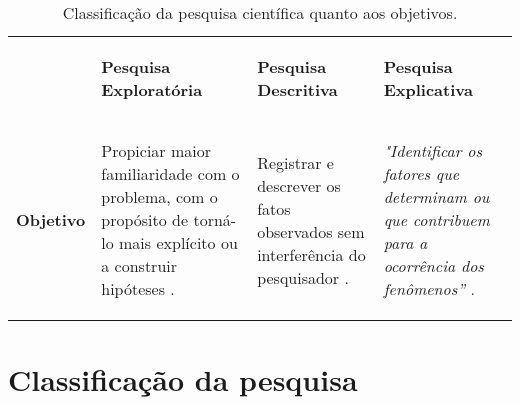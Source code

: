 \begin{table}[h]
 \centering
 \caption{Classificação da pesquisa científica quanto aos objetivos.}
 \label{tab:classificacao_pesquisa}
 {\renewcommand\arraystretch{1.25}
 \begin{tabular}{ l l l l }
  \cline{1-1}\cline{2-2}\cline{3-3}\cline{4-4}  
    \multicolumn{1}{|p{1.883cm}|}{\begin{center} 
\end{center}} &
    \multicolumn{1}{p{3.517cm}|}{\begin{center}\textbf{Pesquisa Exploratória}
\end{center}} &
    \multicolumn{1}{p{3.600cm}|}{\begin{center}\textbf{Pesquisa Descritiva}
\end{center}} &
    \multicolumn{1}{p{3.583cm}|}{\begin{center}\textbf{Pesquisa Explicativa}
\end{center}}
  \\  
  \cline{1-1}\cline{2-2}\cline{3-3}\cline{4-4}  
    \multicolumn{1}{|p{1.883cm}|}{\begin{center}\textbf{Objetivo}
\end{center}} &
    \multicolumn{1}{p{3.517cm}|}{\begin{center}Propiciar maior familiaridade com o problema, com o propósito de torná-lo mais explícito ou a construir hipóteses \cite[pág. 41]{gil2002}.
\end{center}} &
    \multicolumn{1}{p{3.600cm}|}{\begin{center}Registrar e descrever os fatos observados sem interferência do pesquisador \cite[pág. 52]{prodanov2013}.
\end{center}} &
    \multicolumn{1}{p{3.583cm}|}{\begin{center}\textit{"Identificar os fatores que determinam ou que contribuem para a ocorrência dos fenômenos”} \cite[pág. 42]{gil2002}.
\end{center}}
  \\  
  \hline

 \end{tabular} }
\end{table}


\section{Classificação da pesquisa}


